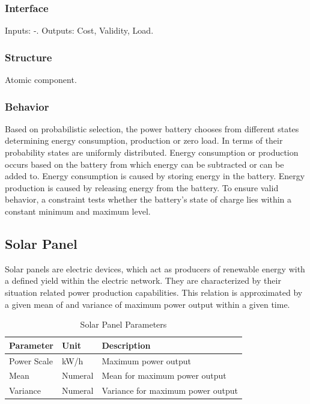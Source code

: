 \subsubsection{Interface}

Inputs: -. Outputs: Cost, Validity, Load.

\subsubsection{Structure}

Atomic component.

\subsubsection{Behavior}

Based on probabilistic selection, the power battery chooses from different states determining energy consumption, production or zero load. In terms of their probability states are uniformly distributed. Energy consumption or production occurs based on the battery from which energy can be subtracted or can be added to. Energy consumption is caused by storing energy in the battery. Energy production is caused by releasing energy from the battery. To ensure valid behavior, a constraint tests whether the battery's state of charge lies within a constant minimum and maximum level.

\subsection{Solar Panel}

Solar panels are electric devices, which act as producers of renewable energy with a defined yield within the electric network. They are characterized by their situation related power production capabilities. This relation is approximated by a given mean of and variance of maximum power output within a given time.

\begin{table}[h]
	\renewcommand{\arraystretch}{1.3}
	\caption{Solar Panel Parameters}
	\centering
	\begin{tabular}{lll}
		\hline
		\textbf{Parameter}                    & \textbf{Unit}    & \textbf{Description} \\ \hline
		Power Scale                       	  & kW/h          	 & Maximum power output \\
		Mean                       	  		  & Numeral          & Mean for maximum power output  \\
		Variance                       	      & Numeral          & Variance for maximum power output \\ \hline
	\end{tabular}
\end{table}

